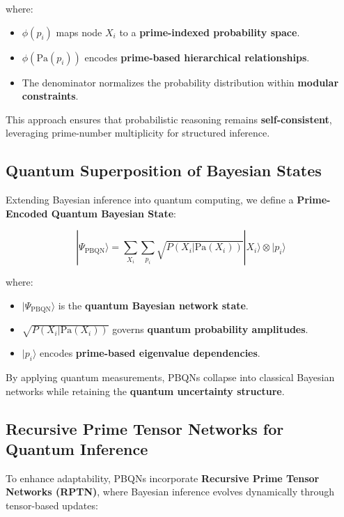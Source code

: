\documentclass{article}
\theoremstyle{plain}
\theoremstyle{plain}
\theoremstyle{definition}
\theoremstyle{remark}
\begin{document}
where:
\begin{itemize}
    \item $\phi(p_i)$ maps node $X_i$ to a \textbf{prime-indexed probability space}.
    \item $\phi(\text{Pa}(p_i))$ encodes \textbf{prime-based hierarchical relationships}.
    \item The denominator normalizes the probability distribution within \textbf{modular constraints}.
\end{itemize}

This approach ensures that probabilistic reasoning remains \textbf{self-consistent}, leveraging prime-number multiplicity for structured inference.

\subsection{Quantum Superposition of Bayesian States}

Extending Bayesian inference into quantum computing, we define a \textbf{Prime-Encoded Quantum Bayesian State}:

\begin{equation}
|\Psi_{\text{PBQN}} \rangle = \sum_{X_i} \sum_{p_i} \sqrt{P(X_i | \text{Pa}(X_i))} |X_i\rangle \otimes |p_i\rangle
\end{equation}

where:
\begin{itemize}
    \item $|\Psi_{\text{PBQN}} \rangle$ is the \textbf{quantum Bayesian network state}.
    \item $\sqrt{P(X_i | \text{Pa}(X_i))}$ governs \textbf{quantum probability amplitudes}.
    \item $|p_i\rangle$ encodes \textbf{prime-based eigenvalue dependencies}.
\end{itemize}

By applying quantum measurements, PBQNs collapse into classical Bayesian networks while retaining the \textbf{quantum uncertainty structure}.

\subsection{Recursive Prime Tensor Networks for Quantum Inference}

To enhance adaptability, PBQNs incorporate \textbf{Recursive Prime Tensor Networks (RPTN)}, where Bayesian inference evolves dynamically through tensor-based updates:
\end{document}
